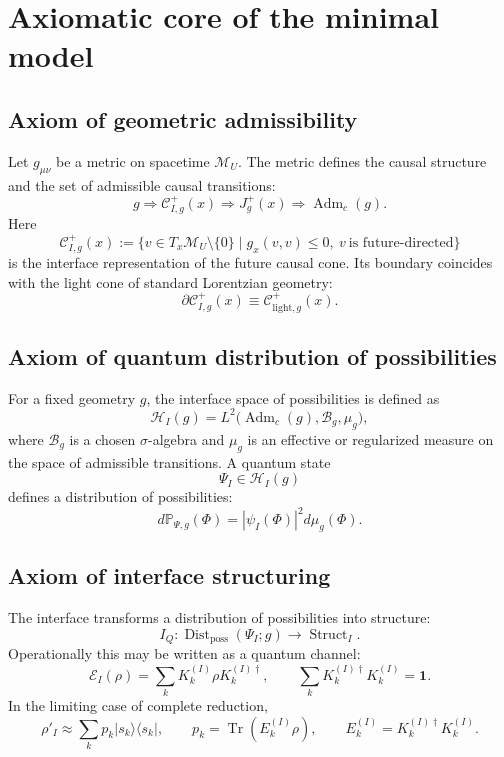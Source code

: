 \documentclass[12pt,a4paper]{article}
\DeclareMathOperator{\Adm}{Adm}
\DeclareMathOperator{\Struct}{Struct}
\DeclareMathOperator{\Dist}{Dist}
\DeclareMathOperator{\Tr}{Tr}
\newcommand{\M}{\mathcal M_U}
\newcommand{\Hilb}{\mathcal H}
\newcommand{\Prob}{\mathbb P}
\begin{document}
\section{Axiomatic core of the minimal model}

\subsection{Axiom of geometric admissibility}

Let \(g_{\mu\nu}\) be a metric on spacetime \(\M\). The metric defines the causal structure and the set of admissible causal transitions:
\[
g
\Rightarrow
\mathcal C^+_{I,g}(x)
\Rightarrow
J_g^+(x)
\Rightarrow
\Adm_c(g).
\]
Here
\[
\mathcal C^{+}_{I,g}(x)
:=
\{v\in T_x\M\setminus\{0\}\mid g_x(v,v)\leq 0,\ v\ \text{is future-directed}\}
\]
is the interface representation of the future causal cone. Its boundary coincides with the light cone of standard Lorentzian geometry:
\[
\partial\mathcal C^{+}_{I,g}(x)
\equiv
\mathcal C^{+}_{\mathrm{light},g}(x).
\]

\subsection{Axiom of quantum distribution of possibilities}

For a fixed geometry \(g\), the interface space of possibilities is defined as
\[
\Hilb_I(g)=L^2\bigl(\Adm_c(g),\mathcal B_g,\mu_g\bigr),
\]
where \(\mathcal B_g\) is a chosen \(\sigma\)-algebra and \(\mu_g\) is an effective or regularized measure on the space of admissible transitions. A quantum state
\[
\Psi_I\in \Hilb_I(g)
\]
defines a distribution of possibilities:
\[
d\Prob_{\Psi,g}(\Phi)=|\psi_I(\Phi)|^2d\mu_g(\Phi).
\]

\subsection{Axiom of interface structuring}

The interface transforms a distribution of possibilities into structure:
\[
I_Q:
\Dist_{\mathrm{poss}}(\Psi_I;g)
\longrightarrow
\Struct_I.
\]
Operationally this may be written as a quantum channel:
\[
\mathcal E_I(\rho)=\sum_k K_k^{(I)}\rho K_k^{(I)\dagger},
\qquad
\sum_k K_k^{(I)\dagger}K_k^{(I)}=\mathbf 1.
\]
In the limiting case of complete reduction,
\[
\rho'_I\approx \sum_k p_k |s_k\rangle\langle s_k|,
\qquad
p_k=\Tr(E_k^{(I)}\rho),
\qquad
E_k^{(I)}=K_k^{(I)\dagger}K_k^{(I)}.
\]
\end{document}
